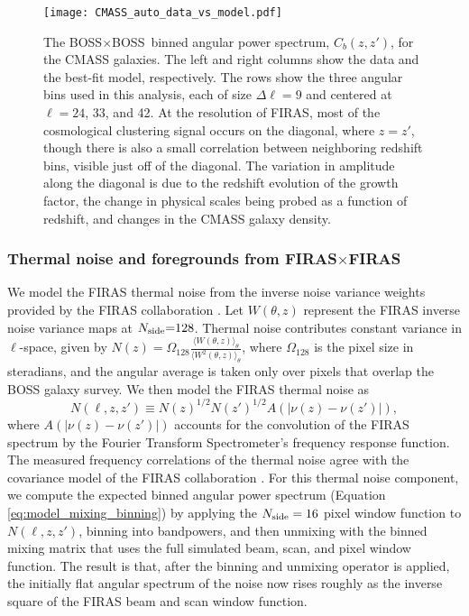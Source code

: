 \documentclass[fleqn,usenatbib]{mnras}
\newcommand{\FF}{FIRAS${\times}$FIRAS}
\newcommand{\BB}{BOSS${\times}$BOSS}
\begin{document}
\begin{figure}
  \texttt{[image: CMASS\_auto\_data\_vs\_model.pdf]}
  \caption{\label{fig:CMASS_gal_model_vs_data} The \BB\ binned angular power spectrum, $C_b(z,z')$, for the CMASS galaxies. The left and right columns show the data and the best-fit model, respectively. The rows show the three angular bins used in this analysis, each of size $\Delta \ell=9$ and centered at $\ell=24$, 33, and 42. At the resolution of FIRAS, most of the cosmological clustering signal occurs on the diagonal, where $z=z'$, though there is also a small correlation between neighboring redshift bins, visible just off of the diagonal. The variation in amplitude along the diagonal is due to the redshift evolution of the growth factor, the change in physical scales being probed as a function of redshift, and changes in the CMASS galaxy density.}
\end{figure}

\subsubsection{Thermal noise and foregrounds from \texorpdfstring{\FF}{FIRASxFIRAS}}
\label{subsec:FIRAS_auto}

We model the FIRAS thermal noise from the inverse noise variance weights provided by the FIRAS collaboration \citep{FIRASexplanatory}. Let $W(\theta, z)$ represent the FIRAS inverse noise variance maps at $N_{\rm side}{=}128$. Thermal noise contributes constant variance in $\ell$-space, given by $N(z){=}\Omega_{128} \frac{\langle W(\theta,z)\rangle_{\theta}}{\langle W^2(\theta,z)\rangle_{\theta}}$, where $\Omega_{128}$ is the pixel size in steradians, and the angular average is taken only over pixels that overlap the BOSS galaxy survey. 
We then model the FIRAS thermal noise as
\begin{equation}\label{eq:thermal_noise_model}
N(\ell, z, z') \equiv N(z)^{1/2}N(z')^{1/2}A\left(|\nu(z) - \nu(z')|\right),
\end{equation}
where $A\left(|\nu(z) - \nu(z')|\right)$ accounts for the convolution of the FIRAS spectrum by the Fourier Transform Spectrometer's frequency response function. 
The measured frequency correlations of the thermal noise agree with the covariance model of the FIRAS collaboration \citep{FIRASexplanatory}. For this thermal noise component, we compute the expected binned angular power spectrum (Equation\,\ref{eq:model_mixing_binning}) by applying the $N_{\rm side}=16$ pixel window function to $N(\ell, z, z')$, binning into bandpowers, and then unmixing with the binned mixing matrix that uses the full simulated beam, scan, and pixel window function. The result is that, after the binning and unmixing operator is applied, the initially flat angular spectrum of the noise now rises roughly as the inverse square of the FIRAS beam and scan window function. 
\end{document}

